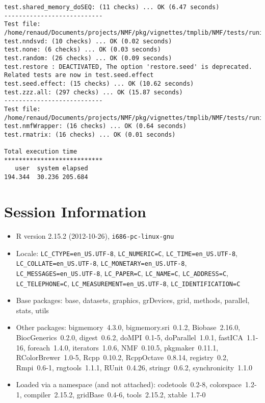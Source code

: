 \documentclass[10pt]{article}
\begin{document}
\begin{verbatim}
test.shared_memory_doSEQ: (11 checks) ... OK (6.47 seconds)
--------------------------- 
Test file: /home/renaud/Documents/projects/NMF/pkg/vignettes/tmplib/NMF/tests/runit.seed.r 
test.nndsvd: (10 checks) ... OK (0.02 seconds)
test.none: (6 checks) ... OK (0.03 seconds)
test.random: (26 checks) ... OK (0.09 seconds)
test.restore : DEACTIVATED, The option 'restore.seed' is deprecated. Related tests are now in test.seed.effect
test.seed.effect: (15 checks) ... OK (10.62 seconds)
test.zzz.all: (297 checks) ... OK (15.87 seconds)
--------------------------- 
Test file: /home/renaud/Documents/projects/NMF/pkg/vignettes/tmplib/NMF/tests/runit.utils.r 
test.nmfWrapper: (16 checks) ... OK (0.64 seconds)
test.rmatrix: (16 checks) ... OK (0.01 seconds)

Total execution time
***************************
   user  system elapsed 
194.344  30.236 205.684 

\end{verbatim}

\section*{Session Information}
\begin{itemize}\raggedright
  \item R version 2.15.2 (2012-10-26), \verb|i686-pc-linux-gnu|
  \item Locale: \verb|LC_CTYPE=en_US.UTF-8|, \verb|LC_NUMERIC=C|, \verb|LC_TIME=en_US.UTF-8|, \verb|LC_COLLATE=en_US.UTF-8|, \verb|LC_MONETARY=en_US.UTF-8|, \verb|LC_MESSAGES=en_US.UTF-8|, \verb|LC_PAPER=C|, \verb|LC_NAME=C|, \verb|LC_ADDRESS=C|, \verb|LC_TELEPHONE=C|, \verb|LC_MEASUREMENT=en_US.UTF-8|, \verb|LC_IDENTIFICATION=C|
  \item Base packages: base, datasets, graphics, grDevices, grid,
    methods, parallel, stats, utils
  \item Other packages: bigmemory~4.3.0, bigmemory.sri~0.1.2,
    Biobase~2.16.0, BiocGenerics~0.2.0, digest~0.6.2, doMPI~0.1-5,
    doParallel~1.0.1, fastICA~1.1-16, foreach~1.4.0, iterators~1.0.6,
    NMF~0.10.5, pkgmaker~0.11.1, RColorBrewer~1.0-5, Rcpp~0.10.2,
    RcppOctave~0.8.14, registry~0.2, Rmpi~0.6-1, rngtools~1.1.1,
    RUnit~0.4.26, stringr~0.6.2, synchronicity~1.1.0
  \item Loaded via a namespace (and not attached): codetools~0.2-8,
    colorspace~1.2-1, compiler~2.15.2, gridBase~0.4-6, tools~2.15.2,
    xtable~1.7-0
\end{itemize}
\end{document}

